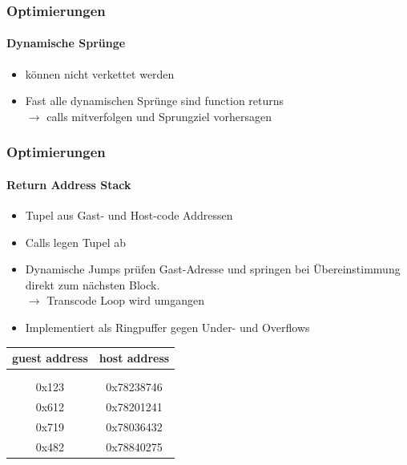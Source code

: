 \begin{frame}
	\frametitle{Optimierungen}
	\framesubtitle{Dynamische Sprünge}
	\begin{itemize}
		\item können nicht verkettet werden
		\pause
		\item Fast alle dynamischen Sprünge sind function returns\\
		$\rightarrow$ calls mitverfolgen und Sprungziel vorhersagen
	\end{itemize}
\end{frame}

\begin{frame}
	\frametitle{Optimierungen}
	\framesubtitle{Return Address Stack}
	
	\begin{minipage}[t]{.47\textwidth}
		\begin{itemize}
			\item Tupel aus Gast- und Host-code Addressen
			\pause
			\item Calls legen Tupel ab
			\item Dynamische Jumps prüfen Gast-Adresse und springen bei Übereinstimmung direkt zum nächsten Block. \\
			\pause
			$\rightarrow$ Transcode Loop wird umgangen
			\pause
			\item Implementiert als Ringpuffer gegen Under- und Overflows
			
		\end{itemize}
	\end{minipage}
	\begin{minipage}[t]{.47\textwidth}
		\vspace{0.1cm}
		\centering
		\begin{tabular} { |c|c| }
			\hline
			guest address & host address \\ [0.5ex]
			\hline\hline
			  & \\
			 \hline
			  & \\
			 \hline
			0x123 & 0x78238746 \\
			\hline
			0x612 & 0x78201241 \\
			\hline
			0x719 & 0x78036432 \\
			\hline
			0x482 & 0x78840275 \\
			\hline
		\end{tabular}
	\end{minipage}
	
\end{frame}

